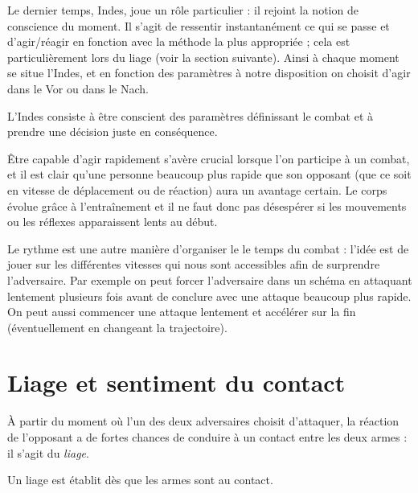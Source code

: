
Le dernier temps, Indes, joue un rôle particulier : il rejoint la notion de conscience du moment.
Il s'agit de ressentir instantanément ce qui se passe et d'agir/réagir en fonction avec la méthode la plus appropriée ; cela est particulièrement lors du liage (voir la section suivante).
Ainsi à chaque moment se situe l'Indes, et en fonction des paramètres à notre disposition on choisit d'agir dans le Vor ou dans le Nach.

\begin{definition}

L'Indes consiste à être conscient des paramètres définissant le combat et à prendre une décision juste en conséquence.
\end{definition}


Être capable d'agir rapidement s'avère crucial lorsque l'on participe à un combat, et il est clair qu'une personne beaucoup plus rapide que son opposant (que ce soit en vitesse de déplacement ou de réaction) aura un avantage certain.
Le corps évolue grâce à l'entraînement et il ne faut donc pas désespérer si les mouvements ou les réflexes apparaissent lents au début.

Le rythme est une autre manière d'organiser le le temps du combat : l'idée est de jouer sur les différentes vitesses qui nous sont accessibles afin de surprendre l'adversaire.
Par exemple on peut forcer l'adversaire dans un schéma en attaquant lentement plusieurs fois avant de conclure avec une attaque beaucoup plus rapide.
On peut aussi commencer une attaque lentement et accélérer sur la fin (éventuellement en changeant la trajectoire).


\section{Liage et sentiment du contact}


À partir du moment où l'un des deux adversaires choisit d'attaquer, la réaction de l'opposant a de fortes chances de conduire à un contact entre les deux armes : il s'agit du \emph{liage}.


\begin{definition}[Liage]
\label{conc:def:liage}

Un liage est établit dès que les armes sont au contact.
\end{definition}


